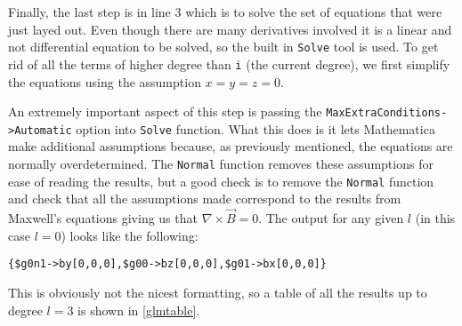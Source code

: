 \documentclass{article}
\begin{document}
Finally, the last step is in line 3 which is to solve the set of equations that were just layed out. Even though there are many derivatives involved it is a linear and not differential equation to be solved, so the built in \lstinline{Solve} tool is used. To get rid of all the terms of higher degree than \lstinline{i} (the current degree), we first simplify the equations using the assumption $x=y=z=0$. 

An extremely important aspect of this step is passing the \lstinline{MaxExtraConditions->Automatic} option into \lstinline{Solve} function. What this does is it lets Mathematica make additional assumptions because, as previously mentioned, the equations are normally overdetermined. The \lstinline{Normal} function removes these assumptions for ease of reading the results, but a good check is to remove the \lstinline{Normal} function and check that all the assumptions made correspond to the results from Maxwell's equations giving us that $\nabla\times\vec B=0$. The output for any given $l$ (in this case $l=0$) looks like the following: 

\begin{lstlisting}
{$g0n1->by[0,0,0],$g00->bz[0,0,0],$g01->bx[0,0,0]}
\end{lstlisting}

This is obviously not the nicest formatting, so a table of all the results up to degree $l=3$ is shown in \ref{glmtable}. 
\end{document}
